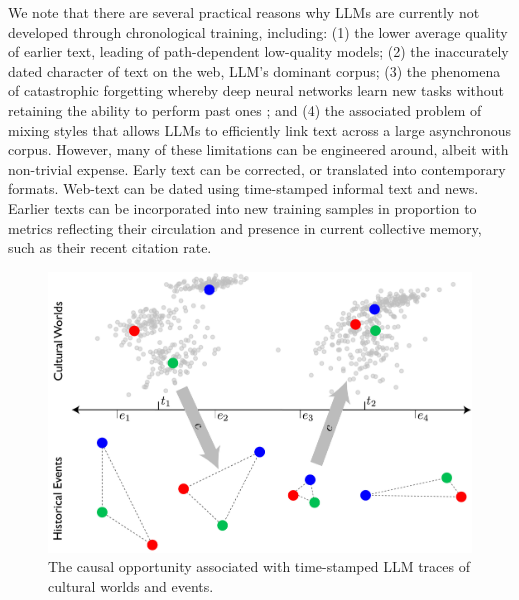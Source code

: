 \documentclass{article} %
\begin{document}
We note that there are several practical reasons why LLMs are currently
not developed through chronological training, including: (1) the lower
average quality of earlier text, leading of path-dependent low-quality
models; (2) the inaccurately dated character of text on the web, LLM's
dominant corpus; (3) the phenomena of catastrophic forgetting whereby
deep neural networks learn new tasks without retaining the ability to
perform past ones
\parencite{McCloskey1989-rg, Ratcliff1990-bk}; and (4) the associated problem of mixing styles
that allows LLMs to efficiently link text across a large asynchronous
corpus. However, many of these limitations can be engineered around,
albeit with non-trivial expense. Early text can be corrected, or
translated into contemporary formats. Web-text can be dated using
time-stamped informal text and news. Earlier texts can be incorporated
into new training samples in proportion to metrics reflecting their
circulation and presence in current collective memory, such as their
recent citation rate.

\begin{figure}[!htbp]
  \captionsetup{justification=raggedright,singlelinecheck=false}
  \caption{The causal opportunity associated with time-stamped LLM traces of cultural worlds and events.}
  \label{fig:future}
  \centering
  \includegraphics[width=\textwidth]{./figures/media/image9.jpg}
\end{figure}
\end{document}
